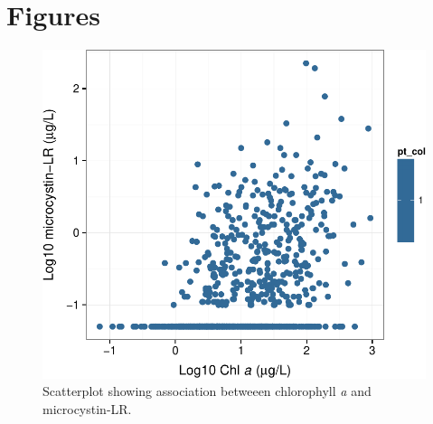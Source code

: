 \documentclass[11pt,]{article}
\begin{document}
\newpage

\section{Figures}\label{figures}

\begin{figure}[htbp]
\centering
\includegraphics{manuscript_files/figure-latex/chla_micro_scatter-1.pdf}
\caption{Scatterplot showing association betweeen chlorophyll \textit{a}
and microcystin-LR. \label{fig:chla_micro_scatter}}
\end{figure}

\newpage
\end{document}
